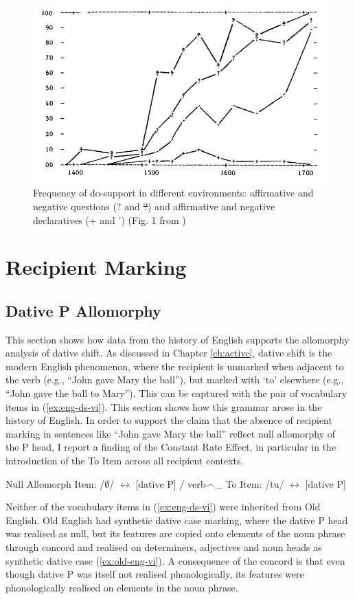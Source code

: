 	\begin{figure}[ht!]
		\includegraphics[width=.5\linewidth]{../images/kroch-graph}
		\caption{Frequency of do-support in different environments: affirmative and negative questions (? and \sout{?}) and affirmative and negative declaratives (+ and ') (Fig. 1 from \citealt{Kroch.1989})}
		\label{fig:kroch-graph}
	\end{figure}

\section{Recipient Marking}
\subsection{Dative P Allomorphy}
This section shows how data from the history of English supports the allomorphy analysis of dative shift. As discussed in Chapter \ref{ch:active}, dative shift is the modern English phenomenon, where the recipient is unmarked when adjacent to the verb (e.g., ``John gave Mary the ball''), but marked with `to' elsewhere (e.g., ``John gave the ball to Mary''). This can be captured with the pair of vocabulary items in (\ref{ex:eng-ds-vi}). This section shows how this grammar arose in the history of English. In order to support the claim that the absence of recipient marking in sentences like ``John gave Mary the ball'' reflect null allomorphy of the P head, I report a finding of the Constant Rate Effect, in particular in the introduction of the To Item across all recipient contexts.  

	\begin{exe}
		\ex \label{ex:eng-ds-vi}
		\begin{xlist}
			\ex Null Allomorph Item: /$\emptyset$/ $\leftrightarrow$ [dative P] / verb$\smallfrown$\_
			\ex To Item: /tu/ $\leftrightarrow$ [dative P]
		\end{xlist}
	\end{exe}


	Neither of the vocabulary items in (\ref{ex:eng-ds-vi}) were inherited from Old English. Old English had synthetic dative case marking, where the dative P head was realised as null, but its features are copied onto elements of the noun phrase through concord and realised on determiners, adjectives and noun heads as synthetic dative case (\ref{ex:old-eng-vi}). A consequence of the concord is that even though dative P was itself not realised phonologically, its features were phonologically realised on elements in the noun phrase. 
	
